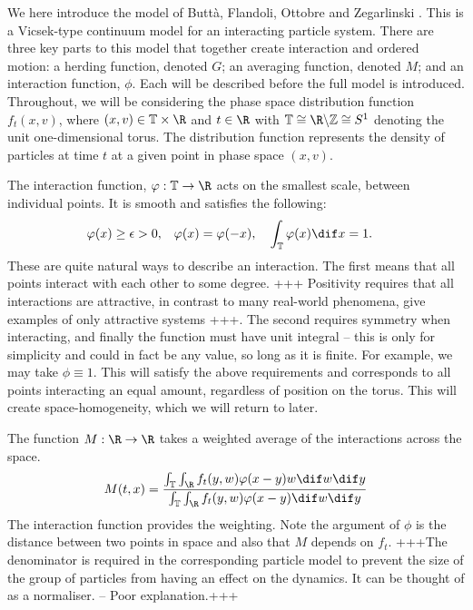 		We here introduce the model of Butt\`a, Flandoli, Ottobre and Zegarlinski \cite{Butta2019}. This is a Vicsek-type continuum model for an interacting particle system. There are three key parts to this model that together create interaction and ordered motion: a herding function, denoted $G$; an averaging function, denoted $M$; and an interaction function, $\phi$. Each will be described before the full model is introduced. Throughout, we will be considering the phase space distribution function $f_t(x,v)$, where $(x,v) \in \T \times \R$ and $t \in \R$ with $\T \cong \R \backslash \Z \cong S^1$ denoting the unit one-dimensional torus. The distribution function represents the density of particles at time $t$ at a given point in phase space $(x,v)$.
		
		The interaction function, $\phi: \T \to \R $ acts on the smallest scale, between individual points. It is smooth and satisfies the following:
		\begin{align}\label{eq:phi}
			\phi(x) \geq \epsilon >0, && \phi(x) = \phi(-x), &&& \int_{\T} \phi(x) \dif x = 1.
		\end{align}
		These are quite natural ways to describe an interaction. The first means that all points interact with each other to some degree. +++ Positivity requires that all interactions are attractive, in contrast to many real-world phenomena, give examples of only attractive systems +++. The second requires symmetry when interacting, and finally the function must have unit integral -- this is only for simplicity and could in fact be any value, so long as it is finite. For example, we may take $\phi \equiv 1$. This will satisfy the above requirements and corresponds to all points interacting an equal amount, regardless of position on the torus. This will create space-homogeneity, which we will return to later.
		
		The function $M:\R \to \R$ takes a weighted average of the interactions across the space.	
		\[ 
			M(t,x) = \frac{\int_{\T}\int_{\R}f_t(y,w)\phi(x-y)w\dif w \dif y}{\int_{\T}\int_{\R}f_t(y,w)\phi(x-y)\dif w \dif y}
		\]
		The interaction function provides the weighting. Note the argument of  $\phi$ is the distance between two points in space and also that $M$ depends on $f_t$. +++The denominator is required in the corresponding particle model to prevent the size of the group of particles from having an effect on the dynamics. It can be thought of as a normaliser. -- Poor explanation.+++
		
